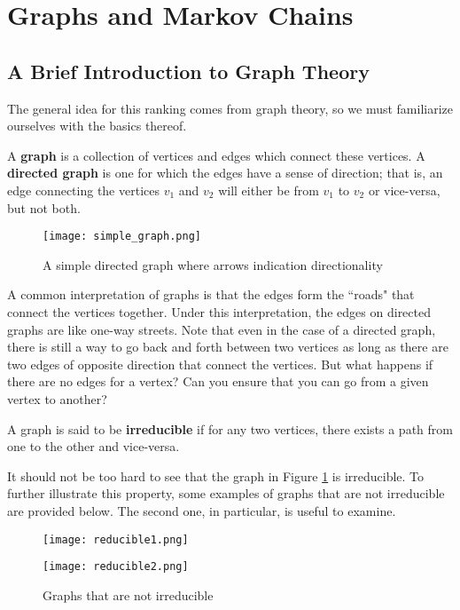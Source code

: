 \documentclass[10pt]{article}
\newenvironment{defn}[2][Definition:]{\begin{trivlist}
\item[\hskip \labelsep {\bfseries #1}\hskip \labelsep {\bfseries #2}]}{\end{trivlist}}
\begin{document}
\section{Graphs and Markov Chains}
\subsection{A Brief Introduction to Graph Theory}
The general idea for this ranking comes from graph theory, so we must familiarize ourselves with the basics thereof.
\begin{defn}{}
A \textbf{graph} is a collection of vertices and edges which connect these vertices. A \textbf{directed graph} is one for which the edges have a sense of direction; that is, an edge connecting the vertices $v_1$ and $v_2$ will either be from $v_1$ to $v_2$ or vice-versa, but not both.
\end{defn}
\begin{figure}[h!]
    \centering
    \texttt{[image: simple\_graph.png]}
    \caption{A simple directed graph where arrows indication directionality}
    \label{fig:2.11}
\end{figure}
A common interpretation of graphs is that the edges form the ``roads" that connect the vertices together. Under this interpretation, the edges on directed graphs are like one-way streets. Note that even in the case of a directed graph, there is still a way to go back and forth between two vertices as long as there are two edges of opposite direction that connect the vertices. But what happens if there are no edges for a vertex? Can you ensure that you can go from a given vertex to another?
\begin{defn}{}
A graph is said to be \textbf{irreducible} if for any two vertices, there exists a path from one to the other and vice-versa.
\end{defn}
It should not be too hard to see that the graph in Figure \ref{fig:2.11} is irreducible. To further illustrate this property, some examples of graphs that are not irreducible are provided below. The second one, in particular, is useful to examine.
\begin{figure}[h!]
    \begin{minipage}[b]{0.5\linewidth}
    \centering
    \texttt{[image: reducible1.png]} 
  \end{minipage}%
  \begin{minipage}[b]{0.5\linewidth}
    \centering
    \texttt{[image: reducible2.png]} 
  \end{minipage} 
    \caption{Graphs that are not irreducible}
    \label{fig:2.12}
\end{figure}\\
\end{document}
